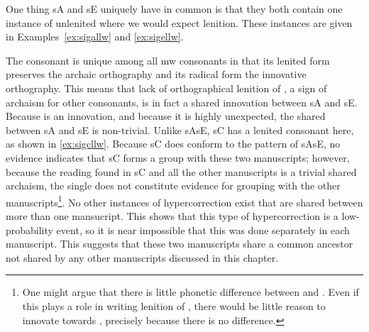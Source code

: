 One thing \gls{sA} and \gls{sE} uniquely have in common is that they both contain one instance of unlenited  where we would expect lenition. These instances are given in Examples~\ref{ex:sigallw} and \ref{ex:sigellw}.
\begin{mwl}
\end{mwl}
The consonant  is unique among all \gls{mw} consonants in that its lenited form preserves the archaic orthography and its radical form the innovative orthography. This means that lack of orthographical lenition of , a sign of archaism for other consonants, is in fact a shared innovation between \gls{sA} and \gls{sE}. Because  is an innovation, and because it is highly unexpected, the shared  between \gls{sA} and \gls{sE} is non-trivial. Unlike \gls{sA}\gls{sE}, \gls{sC} has a lenited consonant here, as shown in \ref{ex:sigcllw}.
Because \gls{sC} does conform to the pattern of \gls{sA}\gls{sE}, no evidence indicates that \gls{sC} forms a group with these two manuscripts; however, because the reading   found in \gls{sC} and all the other manuscripts is a trivial shared archaism, the single  does not constitute  evidence for grouping with the other manuscripts\footnote{One might argue that there is little phonetic difference between  and . Even if this plays a role in writing lenition of , there would be little reason to innovate towards , precisely because there is no difference.}. No other instances of hypercorrection exist that are shared between more than one mansucript.  This shows that this type of hypercorrection is a low-probability event, so it is  near impossible that this was done separately in each manuscript.  This suggests that these two manuscripts share a common ancestor not shared by any other manuscripts discussed in this chapter.


